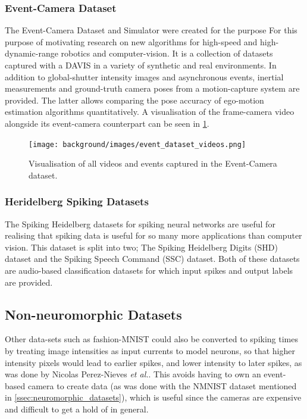 \subsubsection{Event-Camera Dataset} \label{sssec:event_camera_dataset}

The Event-Camera Dataset and Simulator\cite{EventCameraDataset} were created for the purpose For this purpose of motivating research on new algorithms for high-speed and high-dynamic-range robotics and computer-vision. It is a collection of datasets captured with a DAVIS in a variety of synthetic and real environments. In addition to global-shutter intensity images and asynchronous events, inertial measurements and ground-truth camera poses from a motion-capture system are provided. The latter allows comparing the pose accuracy of ego-motion estimation algorithms quantitatively. A visualisation of the frame-camera video alongside its event-camera counterpart can be seen in \cref{fig:event_dataset_videos}.

\begin{figure}[htb]
      \centering
      \texttt{[image: background/images/event\_dataset\_videos.png]}
      \caption{Visualisation of all videos and events captured in the Event-Camera dataset\cite{EventCameraDataset}.}
      \label{fig:event_dataset_videos}
\end{figure}

\subsubsection{Heridelberg Spiking Datasets} \label{sssec:heridelberg_spiking}

The Spiking Heidelberg datasets for spiking neural networks\cite{SpikingHeidelberg} are useful for realising that spiking data is useful for so many more applications than computer vision. This dataset is split into two; The Spiking Heidelberg Digits (SHD) dataset and the Spiking Speech Command (SSC) dataset. Both of these datasets are audio-based classification datasets for which input spikes and output labels are provided.

\subsection{Non-neuromorphic Datasets}

Other data-sets such as fashion-MNIST could also be converted to spiking times by treating image intensities as input currents to model neurons, so that higher intensity pixels would lead to earlier spikes, and lower intensity to later spikes, as was done by Nicolas Perez-Nieves \textit{et al.}\cite{NeuralHetroPromRobLearn}. This avoids having to own an event-based camera to create data (as was done with the NMNIST dataset mentioned in \cref{ssec:neuromorphic_datasets}), which is useful since the cameras are expensive and difficult to get a hold of in general.